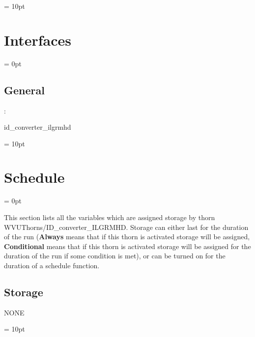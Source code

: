 \documentclass{article}
\begin{document}
\vspace{0.5cm}\parskip = 10pt 

\section{Interfaces} 


\parskip = 0pt

\vspace{3mm} \subsection*{General}

: 

id\_converter\_ilgrmhd
\vspace{2mm}

\vspace{5mm}\parskip = 10pt 

\section{Schedule} 


\parskip = 0pt


\noindent This section lists all the variables which are assigned storage by thorn WVUThorns/ID\_converter\_ILGRMHD.  Storage can either last for the duration of the run ({\bf Always} means that if this thorn is activated storage will be assigned, {\bf Conditional} means that if this thorn is activated storage will be assigned for the duration of the run if some condition is met), or can be turned on for the duration of a schedule function.


\subsection*{Storage}NONE

\vspace{5mm}\parskip = 10pt 
\end{document}
